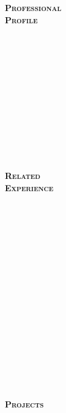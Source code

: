 \documentclass[11pt]{article}
\begin{document}
\begin{minipage}[t]{0.2\linewidth} 
	\textbf{\textsc{
	\hspace{-5pt}Professional\\Profile \\ \\ \\ \\ \\ \\ \\ \\ \\ \\ \\ \\ \\
	Related\\Experience \\ \\ \\ \\ \\ \\ \\ \\ \\ \\ \\ \\ \\ \\ \\ \\ \\ \\
	Projects
	}}
\end{minipage}
\end{document}
